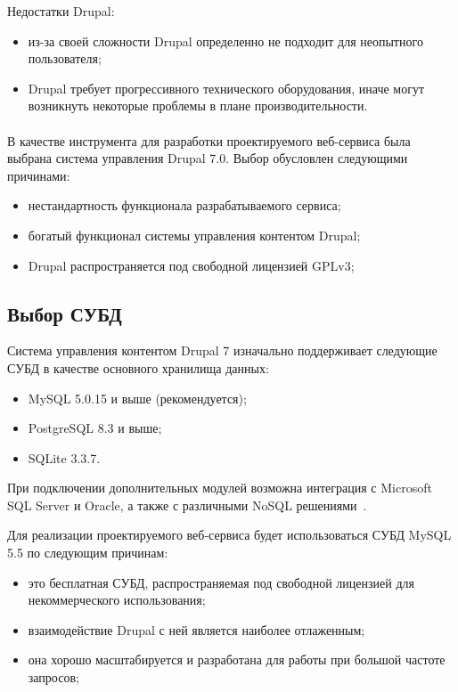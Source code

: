 Недостатки Drupal:
\begin{itemize}
\item 
  из-за своей сложности Drupal определенно не подходит для неопытного пользователя;
\item
  Drupal требует прогрессивного технического оборудования,
  иначе могут возникнуть некоторые проблемы в плане производительности.
\end{itemize}

\paragraph{}
В качестве инструмента для разработки проектируемого веб-сервиса была выбрана система управления Drupal 7.0.
Выбор обусловлен следующими причинами:
\begin{itemize}
\item
  нестандартность функционала разрабатываемого сервиса;
\item
  богатый функционал системы управления контентом Drupal;
\item 
  Drupal распространяется под свободной лицензией GPLv3;
\end{itemize}  

\subsection{Выбор СУБД}
\label{ssec:choice_db}

Система управления контентом Drupal 7 изначально поддерживает следующие СУБД 
в качестве основного хранилища данных:
\begin{itemize} 
\item
  MySQL 5.0.15 и выше (рекомендуется);

\item
  PostgreSQL 8.3 и выше;

\item
  SQLite 3.3.7.
\end{itemize}

При подключении дополнительных модулей возможна интеграция с Microsoft SQL Server и Oracle,
а также с различными NoSQL решениями~\cite{drupal_database}.

Для реализации проектируемого веб-сервиса будет использоваться СУБД MySQL 5.5 по следующим причинам:
\begin{itemize}
\item
  это бесплатная СУБД, распространяемая под свободной лицензией для некоммерческого использования;
\item
  взаимодействие Drupal с ней является наиболее отлаженным;
\item
  она хорошо масштабируется и разработана для работы при большой частоте запросов;
\end{itemize}

